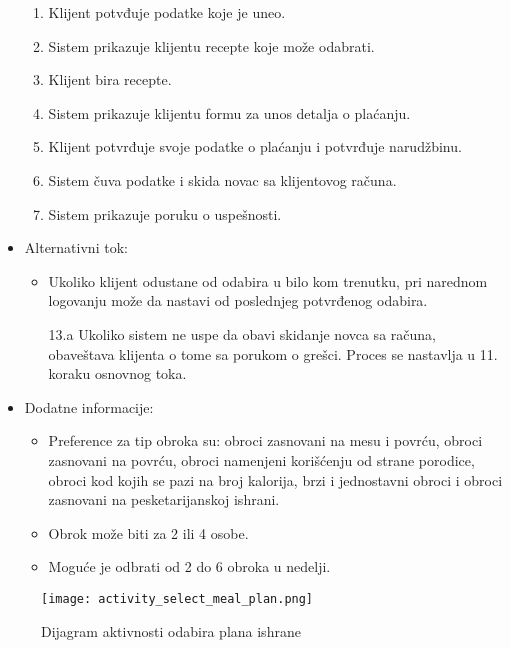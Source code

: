 \begin{itemize}
\begin{enumerate}
            \item Klijent potvđuje podatke koje je uneo.
            \item Sistem prikazuje klijentu recepte koje može odabrati.
            \item Klijent bira recepte.
            \item Sistem prikazuje klijentu formu za unos detalja o plaćanju.
            \item Klijent potvrđuje svoje podatke o plaćanju i potvrđuje narudžbinu.
            \item Sistem čuva podatke i skida novac sa klijentovog računa.
            \item Sistem prikazuje poruku o uspešnosti. 
        \end{enumerate}
    \item Alternativni tok:
        \begin{itemize}
            \item Ukoliko klijent odustane od odabira u bilo kom trenutku, pri narednom logovanju može da nastavi od poslednjeg potvrđenog odabira.
            \item[13.a] Ukoliko sistem ne uspe da obavi skidanje novca sa računa, obaveštava klijenta o tome sa porukom o grešci. Proces se nastavlja u 11. koraku osnovnog toka.
        \end{itemize}
    \item Dodatne informacije:
        \begin{itemize}
            \item Preference za tip obroka su: obroci zasnovani na mesu i povrću, obroci zasnovani na povrću, obroci namenjeni korišćenju od strane porodice, obroci kod kojih se pazi na broj kalorija, brzi i jednostavni obroci i obroci zasnovani na pesketarijanskoj ishrani. 
            \item Obrok može biti za 2 ili 4 osobe.
            \item Moguće je odbrati od 2 do 6 obroka u nedelji.
        \end{itemize}
\end{itemize}

\begin{figure}[H]
\begin{center}
\texttt{[image: activity\_select\_meal\_plan.png]}
\end{center}
    \caption{Dijagram aktivnosti odabira plana ishrane}
\label{fig:ActivitySelectMealPlan}
\end{figure}
